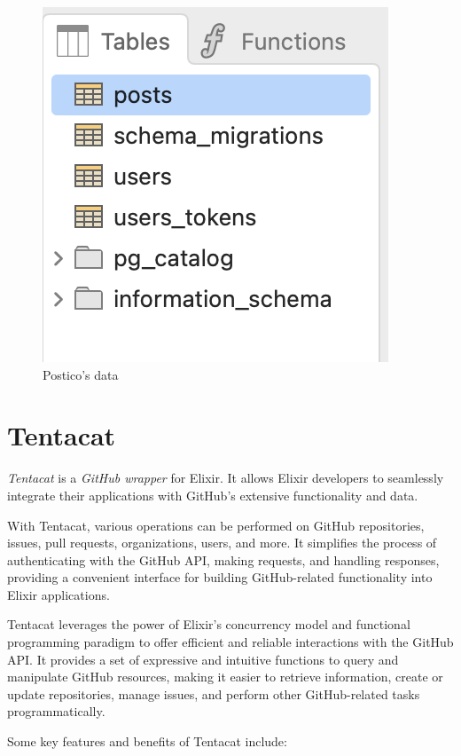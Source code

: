 \begin{figure}[htbp]
	\centering
	\includegraphics[scale=0.5]{figures/postico.png}  %
	\caption{Postico's data}
	\label{fig:postico}
\end{figure}


\section{Tentacat} \label{tentacat}

\textit{Tentacat} is a \textit{GitHub wrapper} for Elixir. It allows Elixir developers to seamlessly integrate their applications with GitHub's extensive functionality and data.

With Tentacat, various operations can be performed on GitHub repositories, issues, pull requests, organizations, users, and more. It simplifies the process of authenticating with the GitHub API, making requests, and handling responses, providing a convenient interface for building GitHub-related functionality into Elixir applications.

Tentacat leverages the power of Elixir's concurrency model and functional programming paradigm to offer efficient and reliable interactions with the GitHub API. It provides a set of expressive and intuitive functions to query and manipulate GitHub resources, making it easier to retrieve information, create or update repositories, manage issues, and perform other GitHub-related tasks programmatically.

Some key features and benefits of Tentacat include:

